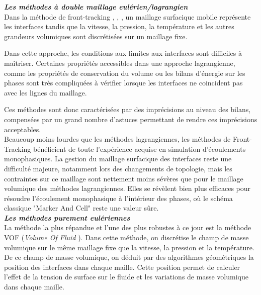 \textit{\textbf{Les m\'ethodes \`a double maillage eul\'erien/lagrangien}}
\smallskip \\

Dans la m\'ethode de front-tracking \cite{Unverdi1992}, \cite{Shin2002}, \cite{Duquennoy2000},
un maillage surfacique mobile repr\'esente les interfaces tandis que la vitesse,
la pression, la temp\'erature et les autres grandeurs volumiques sont discr\'etis\'ees sur un maillage fixe.

Dans cette approche, les conditions aux limites aux interfaces sont difficiles \`a ma\^itriser.
Certaines propri\'et\'es accessibles dans une approche lagrangienne,
comme les propri\'et\'es de conservation du volume ou les bilans d'\'energie sur les phases
sont tr\`es compliqu\'ees à v\'erifier lorsque les interfaces ne coincident pas avec les lignes du maillage.

Ces m\'ethodes sont donc caract\'eris\'ees par des impr\'ecisions au niveau des bilans,
compens\'ees par un grand nombre d'astuces permettant de rendre ces impr\'ecisions acceptables.\\

Beaucoup moins lourdes que les m\'ethodes lagrangiennes, les m\'ethodes de Front-Tracking b\'en\'eficient
de toute l'exp\'erience acquise en simulation d'\'ecoulements monophasiques.
La gestion du maillage surfacique des interfaces reste une difficult\'e majeure,
notamment lors des changements de topologie, mais les contraintes sur ce maillage sont
nettement moins s\'ev\`eres que pour le maillage volumique des m\'ethodes lagrangiennes.
Elles se r\'ev\`elent bien plus efficaces pour r\'esoudre l'\'ecoulement monophasique \`a l'int\'erieur des phases,
o\`u le sch\'ema classique "Marker And Cell" reste une valeur s\^ure.
\smallskip \\

\textit{\textbf{Les m\'ethodes purement eul\'eriennes}}
\smallskip \ \\

La m\'ethode la plus r\'epandue et l'une des plus robustes \`a ce jour est
la m\'ethode VOF (\emph{Volume Of Fluid} \cite{Hirt1981}).
Dans cette m\'ethode, on discr\'etise le champ de masse volumique sur le m\^eme maillage fixe que la vitesse,
la pression et la temp\'erature.
De ce champ de masse volumique, on d\'eduit par des algorithmes g\'eom\'etriques la position
des interfaces dans chaque maille. Cette position permet de calculer l'effet de la tension de surface sur le fluide
et les variations de masse volumique dans chaque maille.

